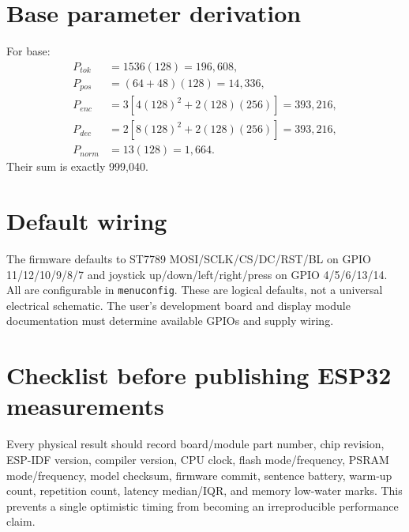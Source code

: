 \documentclass{article}
\begin{document}
\section{Base parameter derivation}
For base:
\begin{align}
P_{tok}&=1536(128)=196{,}608,\\
P_{pos}&=(64+48)(128)=14{,}336,\\
P_{enc}&=3[4(128)^2+2(128)(256)]=393{,}216,\\
P_{dec}&=2[8(128)^2+2(128)(256)]=393{,}216,\\
P_{norm}&=13(128)=1{,}664.
\end{align}
Their sum is exactly 999,040.

\section{Default wiring}
The firmware defaults to ST7789 MOSI/SCLK/CS/DC/RST/BL on GPIO 11/12/10/9/8/7 and joystick up/down/left/right/press on GPIO 4/5/6/13/14. All are configurable in \texttt{menuconfig}. These are logical defaults, not a universal electrical schematic. The user's development board and display module documentation must determine available GPIOs and supply wiring.

\section{Checklist before publishing ESP32 measurements}
Every physical result should record board/module part number, chip revision, ESP-IDF version, compiler version, CPU clock, flash mode/frequency, PSRAM mode/frequency, model checksum, firmware commit, sentence battery, warm-up count, repetition count, latency median/IQR, and memory low-water marks. This prevents a single optimistic timing from becoming an irreproducible performance claim.
\end{document}
